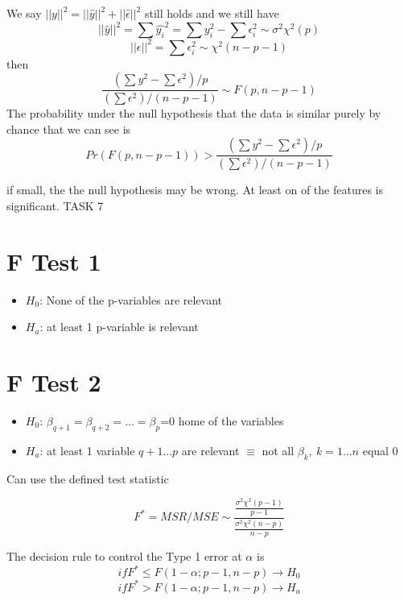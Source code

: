 We say $||y||^2 = ||\hat{y}||^2 + ||\hat{\epsilon}||^2$ still holds and we still have
\[ 
||\hat{y}||^2 = \sum\hat{y_i}^2 = \sum y_i^2 - \sum\epsilon_i^2 \sim \sigma^2 \chi^2(p)
\]
\[ 
||\epsilon||^2= \sum \epsilon_i^2 \sim \chi^2(n-p-1)
\]
then 
\[
\frac{(\sum y^2 - \sum \epsilon^2)/p}{(\sum \epsilon^2)/(n-p-1)} \sim F(p,n-p-1)
\]
The probability under the null hypothesis that the data is similar purely by chance that we can see is
\[
Pr(F(p,n-p-1)) > \frac{(\sum y^2 - \sum \epsilon^2)/p}{(\sum \epsilon^2)/(n-p-1)} 
\]

if small, the the null hypothesis may be wrong. At least on of the features is significant. TASK 7

\section{F Test 1} 
\begin{itemize}
    \item $H_0$: None of the p-variables are relevant
    \item $H_a$: at least 1 p-variable is relevant
\end{itemize}

\section{F Test 2 } 
\begin{itemize}
    \item $H_0$: $\beta_{q+1}=\beta_{q+2}= ...=\beta_{p}$=0 home of the variables 
    \item $H_a$: at least 1 variable $q+1 ...p$ are relevant $\equiv$ not all $\beta_k, \: k=1...n$ equal 0
\end{itemize}
Can use the defined test statistic

\[
F^* = MSR/MSE \sim \frac{\frac{\sigma^2\chi^2(p-1)}{p-1}}{\frac{\sigma^2\chi^2(n-p)}{n-p}}
\]

The decision rule to control the  Type 1 error at $\alpha$ is
\[
if F^* \leq F(1-\alpha;p-1,n-p) \to H_0
\]
\[
if F^* > F(1-\alpha;p-1,n-p) \to H_a
\]
